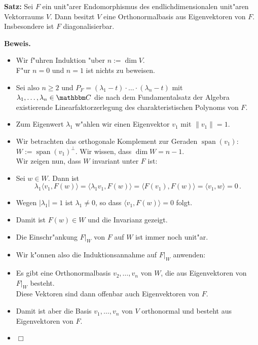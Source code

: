\documentclass[a4paper%
]{report}
\DeclareMathOperator{\Span}{span}
\begin{document}
\Large

{\bfseries Satz:} Sei $F$ ein unit"arer Endomorphismus des
endlichdimensionalen unit"aren Vektorraums $V$. Dann besitzt $V$ eine
Orthonormalbasis aus Eigenvektoren von $F$. Insbesondere ist $F$
diagonalisierbar.
\medskip

{\bfseries Beweis.}

\begin{itemize}[\mbox{}]
\addtolength{\itemsep}{4mm}
\item Wir f"uhren Induktion "uber $n:=\dim V$. 
\\ F"ur $n = 0$ und $n = 1$ ist nichts zu beweisen.
\item Sei also $n \ge 2$ und $P_F = (\lambda_1 - t) \cdot \ldots \cdot
  (\lambda_n - t)$ mit $\lambda_1, \ldots, \lambda_n \in \C$
  die nach dem Fundamentalsatz der Algebra existierende
  Linearfaktorzerlegung des charakteristischen Polynoms von $F$.
\item Zum Eigenwert $\lambda_1$ w"ahlen wir einen Eigenvektor $v_1$
  mit $\|v_1\| = 1$. 
\item Wir betrachten das orthogonale Komplement zur Geraden
  $\Span(v_1)$: $W:= \Span(v_1)^\perp$.
\quad Wir wissen, dass $\dim W = n-1$.
\\ Wir zeigen nun, dass $W$ invariant unter $F$ ist:
\item Sei $w \in W$. %
   Dann ist $$\lambda_1 \langle v_1, F(w) \rangle
  = \langle \lambda_1 v_1, F(w) \rangle = \langle F(v_1), F(w) \rangle
  = \langle v_1, w \rangle = 0 \,.$$
\item Wegen $|\lambda_1|=1$ ist $\lambda_1 \neq 0$, so dass $\langle
  v_1, F(w) \rangle = 0$ folgt.
\item Damit ist $F(w) \in W$ und die Invarianz gezeigt.
\item Die Einschr"ankung $F|_W$ von $F$ auf $W$ ist immer noch
  unit"ar.
\item Wir k"onnen also die Induktionsannahme auf $F|_W$
  anwenden:
\item Es gibt eine Orthonormalbasis $v_2, \ldots, v_n$ von $W$, die
  aus Eigenvektoren von $F|_W$ besteht.
\\ Diese Vektoren sind dann offenbar auch Eigenvektoren von $F$.
\item Damit ist aber die Basis $v_1, \ldots, v_n$ von $V$ orthonormal
  und besteht aus Eigenvektoren von $F$.
\item \hfill $\Box$
\end{itemize}
  
\end{document}

